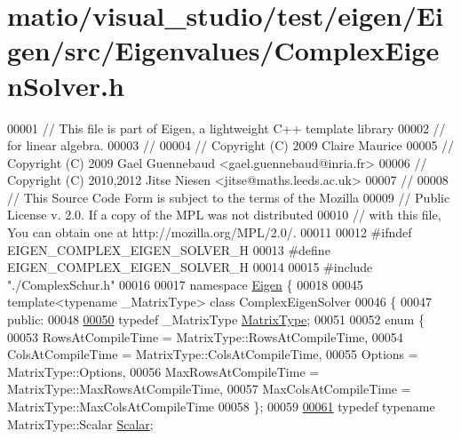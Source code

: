 \hypertarget{matio_2visual__studio_2test_2eigen_2_eigen_2src_2_eigenvalues_2_complex_eigen_solver_8h_source}{}\section{matio/visual\+\_\+studio/test/eigen/\+Eigen/src/\+Eigenvalues/\+Complex\+Eigen\+Solver.h}
\label{matio_2visual__studio_2test_2eigen_2_eigen_2src_2_eigenvalues_2_complex_eigen_solver_8h_source}

\begin{DoxyCode}
00001 \textcolor{comment}{// This file is part of Eigen, a lightweight C++ template library}
00002 \textcolor{comment}{// for linear algebra.}
00003 \textcolor{comment}{//}
00004 \textcolor{comment}{// Copyright (C) 2009 Claire Maurice}
00005 \textcolor{comment}{// Copyright (C) 2009 Gael Guennebaud <gael.guennebaud@inria.fr>}
00006 \textcolor{comment}{// Copyright (C) 2010,2012 Jitse Niesen <jitse@maths.leeds.ac.uk>}
00007 \textcolor{comment}{//}
00008 \textcolor{comment}{// This Source Code Form is subject to the terms of the Mozilla}
00009 \textcolor{comment}{// Public License v. 2.0. If a copy of the MPL was not distributed}
00010 \textcolor{comment}{// with this file, You can obtain one at http://mozilla.org/MPL/2.0/.}
00011 
00012 \textcolor{preprocessor}{#ifndef EIGEN\_COMPLEX\_EIGEN\_SOLVER\_H}
00013 \textcolor{preprocessor}{#define EIGEN\_COMPLEX\_EIGEN\_SOLVER\_H}
00014 
00015 \textcolor{preprocessor}{#include "./ComplexSchur.h"}
00016 
00017 \textcolor{keyword}{namespace }\hyperlink{namespace_eigen}{Eigen} \{ 
00018 
00045 \textcolor{keyword}{template}<\textcolor{keyword}{typename} \_MatrixType> \textcolor{keyword}{class }ComplexEigenSolver
00046 \{
00047   \textcolor{keyword}{public}:
00048 
\hyperlink{group___eigenvalues___module_ad61f6278843a601096276c9a72c0252f}{00050}     \textcolor{keyword}{typedef} \_MatrixType \hyperlink{group___eigenvalues___module_ad61f6278843a601096276c9a72c0252f}{MatrixType};
00051 
00052     \textcolor{keyword}{enum} \{
00053       RowsAtCompileTime = MatrixType::RowsAtCompileTime,
00054       ColsAtCompileTime = MatrixType::ColsAtCompileTime,
00055       Options = MatrixType::Options,
00056       MaxRowsAtCompileTime = MatrixType::MaxRowsAtCompileTime,
00057       MaxColsAtCompileTime = MatrixType::MaxColsAtCompileTime
00058     \};
00059 
\hyperlink{group___eigenvalues___module_a61035d40c9498bb1d47628cdd4946785}{00061}     \textcolor{keyword}{typedef} \textcolor{keyword}{typename} MatrixType::Scalar \hyperlink{group___eigenvalues___module_a61035d40c9498bb1d47628cdd4946785}{Scalar};

\end{DoxyCode}
